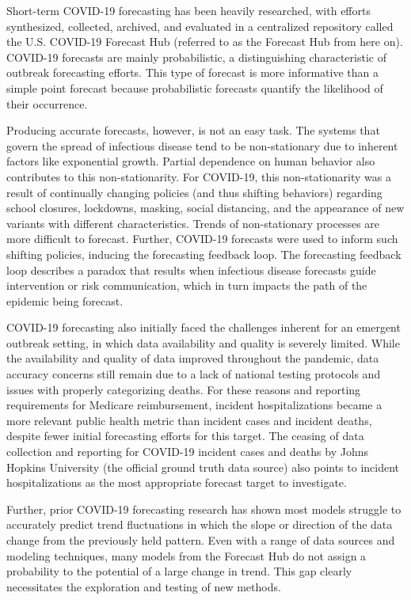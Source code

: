 \documentclass[thesis]{umassthesis}  %
\begin{document}
Short-term COVID-19 forecasting has been heavily researched, with efforts synthesized, collected, archived, and evaluated in a centralized repository called the U.S. COVID-19 Forecast Hub\cite{hub_data_repo} (referred to as the Forecast Hub from here on). COVID-19 forecasts are mainly probabilistic, a distinguishing characteristic of outbreak forecasting efforts. This type of forecast is more informative than a simple point forecast because probabilistic forecasts quantify the likelihood of their occurrence\cite{cramer, hub_data_repo, lauer}.

Producing accurate forecasts, however, is not an easy task. The systems that govern the spread of infectious disease tend to be non-stationary due to inherent factors like exponential growth. Partial dependence on human behavior also contributes to this non-stationarity\cite{lauer}. For COVID-19, this non-stationarity was a result of continually changing policies (and thus shifting behaviors) regarding school closures, lockdowns, masking, social distancing, and the appearance of new variants with different characteristics\cite{cramer}. Trends of non-stationary processes are more difficult to forecast. Further, COVID-19 forecasts were used to inform such shifting policies, inducing the forecasting feedback loop. The forecasting feedback loop describes a paradox that results when infectious disease forecasts guide intervention or risk communication, which in turn impacts the path of the epidemic being forecast\cite{cramer, lauer}.

COVID-19 forecasting also initially faced the challenges inherent for an emergent outbreak setting, in which data availability and quality is severely limited\cite{lauer}. While the availability and quality of data improved throughout the pandemic, data accuracy concerns still remain due to a lack of national testing protocols and issues with properly categorizing deaths\cite{mech_bayes}. For these reasons and reporting requirements for Medicare reimbursement, incident hospitalizations became a more relevant public health metric than incident cases and incident deaths, despite fewer initial forecasting efforts for this target. The ceasing of data collection and reporting for COVID-19 incident cases and deaths by Johns Hopkins University (the official ground truth data source) also points to incident hospitalizations as the most appropriate forecast target to investigate\cite{mech_bayes, jhu_covid, lauer}.

Further, prior COVID-19 forecasting research has shown most models struggle to accurately predict trend fluctuations in which the slope or direction of the data change from the previously held pattern. Even with a range of data sources and modeling techniques, many models from the Forecast Hub do not assign a probability to the potential of a large change in trend\cite{cramer}. This gap clearly necessitates the exploration and testing of new methods.
\end{document}
